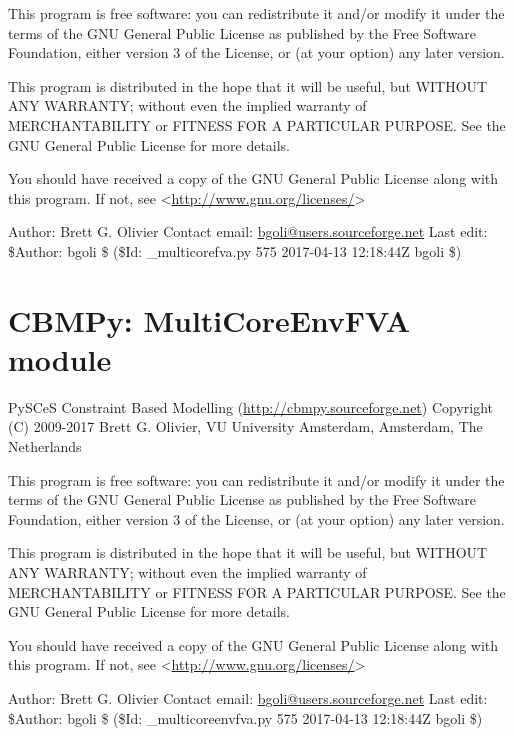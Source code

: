 \documentclass[a4paper,11pt,english]{sphinxmanual}
\begin{document}
This program is free software: you can redistribute it and/or modify
it under the terms of the GNU General Public License as published by
the Free Software Foundation, either version 3 of the License, or
(at your option) any later version.

This program is distributed in the hope that it will be useful,
but WITHOUT ANY WARRANTY; without even the implied warranty of
MERCHANTABILITY or FITNESS FOR A PARTICULAR PURPOSE.  See the
GNU General Public License for more details.

You should have received a copy of the GNU General Public License
along with this program.  If not, see \textless{}\url{http://www.gnu.org/licenses/}\textgreater{}

Author: Brett G. Olivier
Contact email: \href{mailto:bgoli@users.sourceforge.net}{bgoli@users.sourceforge.net}
Last edit: \$Author: bgoli \$ (\$Id: \_multicorefva.py 575 2017-04-13 12:18:44Z bgoli \$)
\label{modules_doc:module-cbmpy._multicoreenvfva}

\section{CBMPy: MultiCoreEnvFVA module}
\label{modules_doc:cbmpy-multicoreenvfva-module}
PySCeS Constraint Based Modelling (\url{http://cbmpy.sourceforge.net})
Copyright (C) 2009-2017 Brett G. Olivier, VU University Amsterdam, Amsterdam, The Netherlands

This program is free software: you can redistribute it and/or modify
it under the terms of the GNU General Public License as published by
the Free Software Foundation, either version 3 of the License, or
(at your option) any later version.

This program is distributed in the hope that it will be useful,
but WITHOUT ANY WARRANTY; without even the implied warranty of
MERCHANTABILITY or FITNESS FOR A PARTICULAR PURPOSE.  See the
GNU General Public License for more details.

You should have received a copy of the GNU General Public License
along with this program.  If not, see \textless{}\url{http://www.gnu.org/licenses/}\textgreater{}

Author: Brett G. Olivier
Contact email: \href{mailto:bgoli@users.sourceforge.net}{bgoli@users.sourceforge.net}
Last edit: \$Author: bgoli \$ (\$Id: \_multicoreenvfva.py 575 2017-04-13 12:18:44Z bgoli \$)
\label{modules_doc:module-cbmpy.miriamids}
\end{document}
